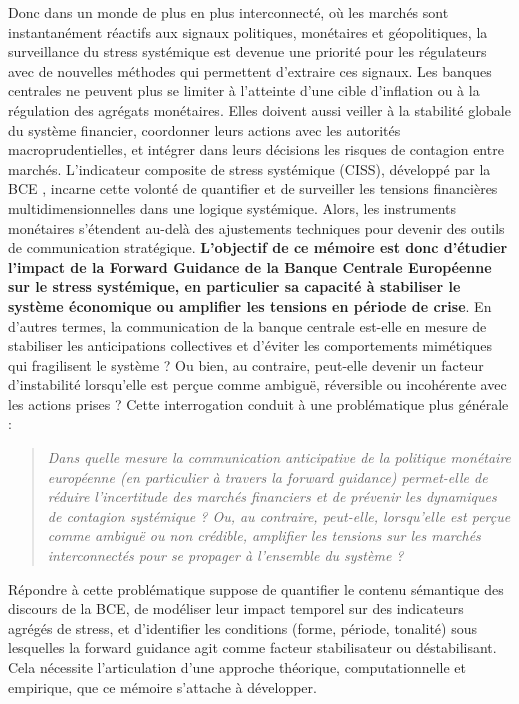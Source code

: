 Donc dans un monde de plus en plus interconnecté, où les marchés sont instantanément réactifs aux signaux politiques, 
monétaires et géopolitiques, la surveillance du stress systémique est devenue une priorité pour les régulateurs avec de nouvelles méthodes qui permettent d'extraire ces signaux. Les 
banques centrales ne peuvent plus se limiter à l’atteinte d’une cible d’inflation ou à la régulation des agrégats 
monétaires. Elles doivent aussi veiller à la stabilité globale du système financier, coordonner leurs actions avec les 
autorités macroprudentielles, et intégrer dans leurs décisions les risques de contagion entre marchés. L’indicateur  composite de stress systémique (CISS), développé par la BCE \citep{hollo2012ciss}, incarne cette volonté de 
quantifier et de surveiller les tensions financières multidimensionnelles dans une logique systémique. Alors, les 
instruments monétaires s’étendent au-delà des ajustements techniques pour devenir des outils de communication 
stratégique. \textbf{L'objectif de ce mémoire est donc d'étudier l'impact de la Forward Guidance de la Banque Centrale Européenne sur le stress systémique, en particulier sa capacité à stabiliser le système économique ou amplifier les tensions en période de crise}. En d’autres termes, la  communication de la banque centrale est-elle en mesure de stabiliser les anticipations collectives et d’éviter les 
comportements mimétiques qui fragilisent le système ? Ou bien, au contraire, peut-elle devenir un facteur 
d’instabilité lorsqu’elle est perçue comme ambiguë, réversible ou incohérente avec les actions prises ? Cette 
interrogation conduit à une problématique plus générale :

\begin{quote}
\textit{Dans quelle mesure la communication anticipative de la politique monétaire européenne (en particulier à travers la forward guidance) permet-elle de réduire l’incertitude des marchés financiers et de prévenir les dynamiques de contagion systémique ? Ou, au contraire, peut-elle, lorsqu’elle est perçue comme ambiguë ou non crédible, amplifier les tensions sur les marchés interconnectés pour se propager à l'ensemble du système ?}
\end{quote}

Répondre à cette problématique suppose de quantifier le contenu sémantique des discours de la BCE, de modéliser leur impact temporel sur des indicateurs agrégés de stress, et d’identifier les conditions (forme, période, tonalité) sous lesquelles la forward guidance agit comme facteur stabilisateur ou déstabilisant. Cela nécessite l’articulation d’une approche théorique, computationnelle et empirique, que ce mémoire s’attache à développer.\\

